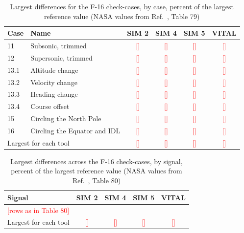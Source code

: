 \documentclass[conf]{new-aiaa}
\newcommand{\tbd}[1]{\textcolor{red}{[#1]}}
\begin{document}
\begin{table}[hbt!]
\caption{\label{tab:case1116} Largest differences for the F-16 check-cases, by case, percent of
the largest reference value (NASA values from Ref.~\cite{nesc2015}, Table 79)}
\centering
\small
\begin{tabular}{llcccc}
\hline\hline
Case & Name & SIM 2 & SIM 4 & SIM 5 & VITAL \\\hline
11   & Subsonic, trimmed            & \tbd{} & \tbd{} & \tbd{} & \tbd{} \\
12   & Supersonic, trimmed          & \tbd{} & \tbd{} & \tbd{} & \tbd{} \\
13.1 & Altitude change              & \tbd{} & \tbd{} & \tbd{} & \tbd{} \\
13.2 & Velocity change              & \tbd{} & \tbd{} & \tbd{} & \tbd{} \\
13.3 & Heading change               & \tbd{} & \tbd{} & \tbd{} & \tbd{} \\
13.4 & Course offset                & \tbd{} & \tbd{} & \tbd{} & \tbd{} \\
15   & Circling the North Pole      & \tbd{} & \tbd{} & \tbd{} & \tbd{} \\
16   & Circling the Equator and IDL & \tbd{} & \tbd{} & \tbd{} & \tbd{} \\\hline
\multicolumn{2}{l}{Largest for each tool} & \tbd{} & \tbd{} & \tbd{} & \tbd{} \\
\hline\hline
\end{tabular}
\end{table}

\begin{table}[hbt!]
\caption{\label{tab:sig1116} Largest differences across the F-16 check-cases, by signal, percent
of the largest reference value (NASA values from Ref.~\cite{nesc2015}, Table 80)}
\centering
\small
\begin{tabular}{lcccc}
\hline\hline
Signal & SIM 2 & SIM 4 & SIM 5 & VITAL \\\hline
\tbd{rows as in Table 80} & & & & \\\hline
Largest for each tool & \tbd{} & \tbd{} & \tbd{} & \tbd{} \\
\hline\hline
\end{tabular}
\end{table}
\end{document}
